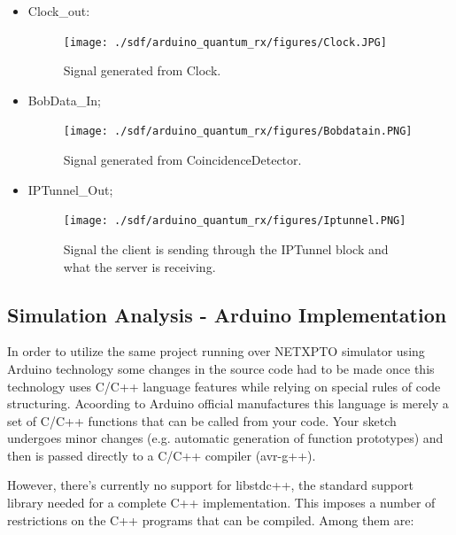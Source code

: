 \begin{refsection}
\begin{itemize}
	
	\item Clock\_out:
	\begin{figure}[H]
		\centering
		\texttt{[image: ./sdf/arduino\_quantum\_rx/figures/Clock.JPG]}
		\caption{Signal generated from Clock.}
		\label{fig:arduino}
	\end{figure}
	\clearpage
	
	\item BobData\_In;
	\begin{figure}[H]
		\centering
		\texttt{[image: ./sdf/arduino\_quantum\_rx/figures/Bobdatain.PNG]}
		\caption{Signal generated from CoincidenceDetector.}
		\label{fig:arduino}
	\end{figure}

		\item IPTunnel\_Out;
	\begin{figure}[H]
		\centering
		\texttt{[image: ./sdf/arduino\_quantum\_rx/figures/Iptunnel.PNG]}
		\caption{Signal the client is sending through the IPTunnel block and what the server is receiving.}
		\label{fig:arduino}
		
	\end{figure}

\end{itemize}
	
	
	\subsection{Simulation Analysis - Arduino Implementation}
	
	In order to utilize the same project running over NETXPTO simulator using Arduino technology some changes in the source code had to be made once this technology uses C/C++ language features while relying on special rules of code structuring. Acoording to Arduino official manufactures this language is merely a set of C/C++ functions that can be called from your code. Your sketch undergoes minor changes (e.g. automatic generation of function prototypes) and then is passed directly to a C/C++ compiler (avr-g++). \par However, there's currently no support for libstdc++, the standard support library needed for a complete C++ implementation. This imposes a number of restrictions on the C++ programs that can be compiled. Among them are:
	

\end{refsection}
